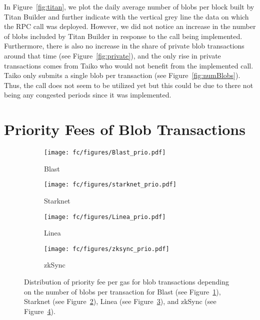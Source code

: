 In Figure~\ref{fig:titan}, we plot the daily average number of blobs per block built by Titan Builder and further indicate with the vertical grey line the data on which the RPC call was deployed. However, we did not notice an increase in the number of blobs included by Titan Builder in response to the call being implemented. Furthermore, there is also no increase in the share of private blob transactions around that time (see Figure~\ref{fig:private}), and the only rise in private transactions comes from Taiko who would not benefit from the implemented call. Taiko only submits a single blob per transaction (see Figure~\ref{fig:numBlobs}). Thus, the call does not seem to be utilized yet but this could be due to there not being any congested periods since it was implemented. 

\section{Priority Fees of Blob Transactions}\label{app:prio}



\begin{figure}[t!]
    \centering
    \begin{subfigure}[t]{0.48\columnwidth}
        \texttt{[image: fc/figures/Blast\_prio.pdf]}
    \caption{Blast}
    \label{fig:Blast_prio}
    \end{subfigure}\hfill
    \begin{subfigure}[t]{0.48\columnwidth}
        \texttt{[image: fc/figures/starknet\_prio.pdf]}
    \caption{Starknet}
    \label{fig:starknet_prio}
    \end{subfigure}    
    \begin{subfigure}[t]{0.48\columnwidth}
        \texttt{[image: fc/figures/Linea\_prio.pdf]}
    \caption{Linea}
    \label{fig:Linea_prio}
    \end{subfigure}\hfill
    \begin{subfigure}[t]{0.48\columnwidth}
        \texttt{[image: fc/figures/zksync\_prio.pdf]}
    \caption{zkSync}
    \label{fig:zksync_prio}
    \end{subfigure}    
    \caption{Distribution of priority fee per gas for blob transactions depending on the number of blobs per transaction for Blast (see Figure~\ref{fig:Blast_prio}), Starknet (see Figure~\ref{fig:starknet_prio}), Linea (see Figure~\ref{fig:Linea_prio}), and zkSync (see Figure~\ref{fig:zksync_prio}). }\label{fig:prio_dist}
\end{figure}

